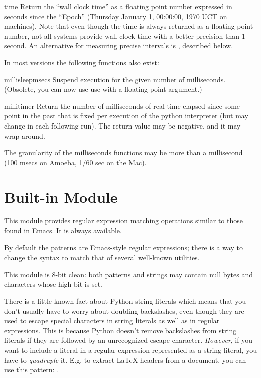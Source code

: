 \begin{funcdesc}{time}{}
Return the ``wall clock time'' as a floating point number expressed in
seconds since the ``Epoch'' (Thursday January 1, 00:00:00, 1970 UCT on
\UNIX{} machines).  Note that even though the time is always returned
as a floating point number, not all systems provide wall clock time
with a better precision than 1 second.  An alternative for measuring
precise intervals is , described below.
\end{funcdesc}

\noindent
In most versions the following functions also exist:

\begin{funcdesc}{millisleep}{msecs}
Suspend execution for the given number of milliseconds.  (Obsolete,
you can now use use  with a floating point argument.)
\end{funcdesc}

\begin{funcdesc}{millitimer}{}
  Return the number of milliseconds of real time elapsed since some
  point in the past that is fixed per execution of the python
  interpreter (but may change in each following run).  The return
  value may be negative, and it may wrap around.
\end{funcdesc}

\noindent
The granularity of the milliseconds functions may be more than a
millisecond (100 msecs on Amoeba, 1/60 sec on the Mac).

\section{Built-in Module }

This module provides regular expression matching operations similar to
those found in Emacs.  It is always available.

By default the patterns are Emacs-style regular expressions; there is
a way to change the syntax to match that of several well-known
\UNIX{} utilities.

This module is 8-bit clean: both patterns and strings may contain null
bytes and characters whose high bit is set.

 There is a little-known fact about Python string literals
which means that you don't usually have to worry about doubling
backslashes, even though they are used to escape special characters in
string literals as well as in regular expressions.  This is because
Python doesn't remove backslashes from string literals if they are
followed by an unrecognized escape character.  \emph{However}, if you
want to include a literal  in a regular expression
represented as a string literal, you have to \emph{quadruple} it.  E.g.
to extract LaTeX  headers from a document, you can
use this pattern: .

